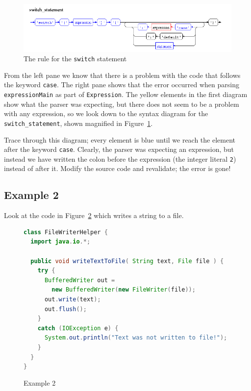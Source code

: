 \documentclass[11pt]{article}
\begin{document}
\begin{figure}[htbp]
\begin{center}
\includegraphics[width=\textwidth,keepaspectratio=fixed]{switchStatementDiagram.png}
\end{center}
\caption{The rule for the \texttt{switch} statement}\label{fig.switch}
\end{figure}

From the left pane we know that there is a problem with the code that
follows the keyword \texttt{case}. The right pane shows that the error occurred when parsing
\texttt{expressionMain} as part of \texttt{Expression}. The yellow
elements in the first diagram show what the parser was expecting, but
there does not seem to be a problem with any expression, so we look down
to the syntax diagram for the \texttt{switch\_statement}, shown
magnified in Figure~\ref{fig.switch}.

Trace through this diagram; every element is blue until we reach the
element after the keyword \texttt{case}. Clearly, the parser was
expecting an expression, but instead we have written the colon before
the expression (the integer literal \texttt{2}) instead of after it.
Modify the source code and revalidate; the error is gone!

\subsection{Example 2}

Look at the code in Figure~\ref{importInsideClassCode} which writes a
string to a file.

\begin{figure}[htbp]
\begin{center}
\begin{lstlisting}[language=Java]
class FileWriterHelper {
  import java.io.*;
 
  public void writeTextToFile( String text, File file ) {
    try {
      BufferedWriter out =
        new BufferedWriter(new FileWriter(file));
      out.write(text);
      out.flush();
    }
    catch (IOException e) {
      System.out.println("Text was not written to file!");
    }
  }
}
\end{lstlisting}
\end{center}
\caption{Example 2}\label{importInsideClassCode}
\end{figure}
\end{document}
